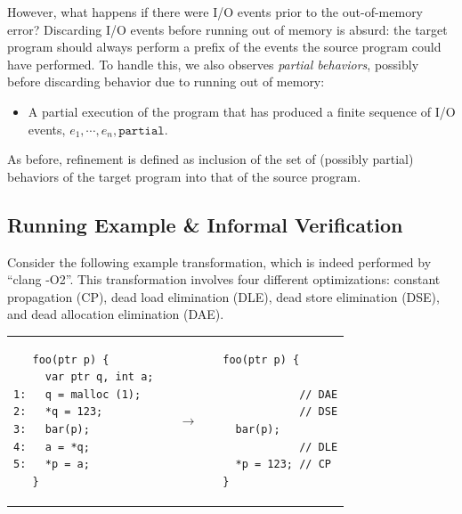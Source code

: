 



However, what happens if there were I/O events prior to the out-of-memory error?  Discarding I/O
events before running out of memory is absurd: the target program should always perform a prefix of
the events the source program could have performed.  To handle this, we also observes \emph{partial
  behaviors}, possibly before discarding behavior due to running out of memory:


\begin{itemize}
\item A partial execution of the program that has produced a finite sequence
of I/O events, $e_1, \cdots, e_n, \mathtt{partial}$.
\end{itemize}
As before, refinement is defined as inclusion of the set of (possibly partial) behaviors of the
target program into that of the source program.




\subsection{Running Example \& Informal Verification}
\label{reasoning:running}

Consider the following example transformation, which is indeed
performed by ``clang -O2''.  This transformation involves four different optimizations: constant propagation (CP), dead load elimination
(DLE), dead store elimination (DSE), and dead allocation elimination
(DAE).
\begin{center}
\begin{tabular}{@{}l@{}l@{}l@{}}
\begin{minipage}{0.37\textwidth}
\begin{verbatim}
   foo(ptr p) {
     var ptr q, int a;
1:   q = malloc (1);
2:   *q = 123;
3:   bar(p);
4:   a = *q;
5:   *p = a;
   }
\end{verbatim}
\end{minipage}
&
$\quad\rightarrow\quad$
&
\begin{minipage}{0.37\textwidth}
\begin{verbatim}
foo(ptr p) {

            // DAE
            // DSE
  bar(p);
            // DLE
  *p = 123; // CP
}
\end{verbatim}
\end{minipage}
\end{tabular}
\end{center}

